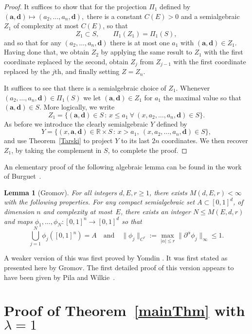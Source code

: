 \documentclass[letterpaper, reqno, 11pt]{amsart}
\newtheorem{lem}{Lemma}[section]
\theoremstyle{remark}
\numberwithin{equation}{section}
\begin{document}
\begin{proof} It suffices to show that for the projection $\Pi_1$ defined by
$(\mathbf{a},\mathbf{d})\mapsto(a_2,\dots, a_n,\mathbf{d}),$
there is a constant $C(E)>0$ and a semialgebraic $Z_1$ of complexity at most $C(E)$,  so that
$$Z_1 \subset S,\quad\quad
\Pi_1(Z_1)=\Pi_1(S),$$
and so that for any $(a_2,\dots,a_n,\mathbf{d})$ there is at most one $a_1$ with $(\mathbf{a},\mathbf{d}) \in Z_1.$
Having done that, we obtain $Z_2$ by applying the same result to $Z_1$ with the first coordinate replaced by the second, obtain $Z_j$ from $Z_{j-1}$ with the first coordinate replaced
by the $j$th, and finally setting $Z=Z_n$.

It suffices to see that there is a semialgebraic choice of $Z_1$. Whenever $(a_2,\dots, a_n,\mathbf{d}) \in \Pi_1(S)$ we let $(\mathbf{a},\mathbf{d}) \in Z_1$ for $a_1$ the maximal value so that
$(\mathbf{a},\mathbf{d}) \in S$. More logically, we write
$$Z_1=\big\{(\mathbf{a},\mathbf{d}) \in S\,:\, x \leq a_1\ \forall\ (x,a_2, \dots,a_n,\mathbf{d}) \in S \big\}.$$
As before we introduce the clearly semialgebraic $Y$ defined by
$$Y=\big\{(x, \mathbf{a},\mathbf{d})\in \mathbb{R}\times S\,:\, x>a_1,\ (x,a_2, \dots,a_n,\mathbf{d}) \in S \big\},$$
and use Theorem~\ref{Tarski} to project $Y$ to its last $2n$ coordinates. We then recover $Z_1$, by taking the complement in $S$, to complete the proof.
\end{proof}

An elementary proof of the following algebraic lemma can be found in the work of Burguet~\cite{B}.

\begin{lem}[Gromov] \label{Burguet} For all integers $d, E, r \geq 1$, there exists $M(d, E, r) < \infty$ with the following
properties. For any compact semialgebraic  set $A \subset [0,1]^d$, of dimension $n$ and complexity at most~$E$, there exists
an integer $N\le M(E,d,r)$ and maps $\phi_1,\dots,\phi_N: [0,1]^n \longrightarrow [0,1]^d$ so that
$$\bigcup_{j=1}^N  \phi_j ([0,1]^n) =A\quad \text{and}\quad \|\phi_j\|_{C^r}:=\max_{|\alpha|\le r}\|\partial^\alpha\phi_j\|_{\infty} \leq 1.$$
\end{lem}

A weaker version of this was first proved by Yomdin \cite{Y}. It was first stated as presented here by Gromov.  The first detailed proof of this version appears to have been given by Pila and Wilkie~\cite{PW}.

\section{Proof of Theorem~\ref{mainThm} with $\lambda=1$}
\end{document}
